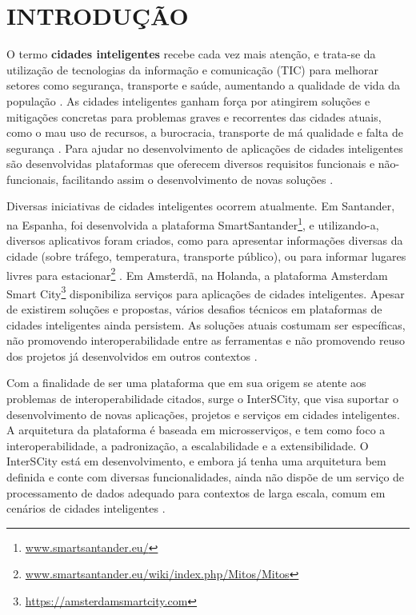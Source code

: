 \chapter[INTRODUÇÃO]{INTRODUÇÃO}
\label{chapter:intro}

O termo \textbf{cidades inteligentes} recebe cada vez mais atenção, e trata-se
da utilização de tecnologias da informação e comunicação (TIC) para melhorar
setores como segurança, transporte e saúde, aumentando a qualidade de vida
da população \cite{batty2012smart}. As cidades inteligentes ganham força por
atingirem soluções e mitigações concretas para problemas graves e recorrentes
das cidades atuais, como o mau uso de recursos, a burocracia, transporte de má
qualidade e falta de segurança \cite{batty2012smart}. Para ajudar no
desenvolvimento de aplicações de cidades inteligentes são desenvolvidas
plataformas que oferecem diversos requisitos funcionais e não-funcionais,
facilitando assim o desenvolvimento de novas soluções \cite{kon2016}.

Diversas iniciativas de cidades inteligentes ocorrem atualmente. Em Santander,
na Espanha, foi desenvolvida a plataforma
SmartSantander\footnote{\url{www.smartsantander.eu/}}, e utilizando-a,
diversos aplicativos foram criados, como para apresentar informações diversas
da cidade (sobre tráfego, temperatura, transporte público), ou para informar
lugares livres para
estacionar\footnote{\url{www.smartsantander.eu/wiki/index.php/Mitos/Mitos}}
\cite{gutierrez2013}.  Em Amsterdã, na Holanda, a plataforma Amsterdam Smart
City\footnote{\url{https://amsterdamsmartcity.com}} disponibiliza serviços para
aplicações de cidades inteligentes. Apesar de existirem soluções
e propostas, vários desafios técnicos em plataformas de cidades inteligentes
ainda persistem. As soluções atuais costumam ser específicas, não promovendo
interoperabilidade entre as ferramentas e não promovendo reuso dos projetos já
desenvolvidos em outros contextos \cite{delesposte2017}.

Com a finalidade de ser uma plataforma que em sua origem se atente aos
problemas de interoperabilidade citados, surge o InterSCity, que visa
suportar o desenvolvimento de novas aplicações, projetos e serviços em cidades
inteligentes. A arquitetura da plataforma é baseada em microsserviços, e
tem como foco a interoperabilidade, a padronização, a escalabilidade e
a extensibilidade. O InterSCity está em desenvolvimento, e embora já tenha uma
arquitetura bem definida e conte com diversas funcionalidades, ainda não dispõe
de um serviço de processamento de dados adequado para contextos de larga
escala, comum em cenários de cidades inteligentes \cite{alnuaimi2015}.

